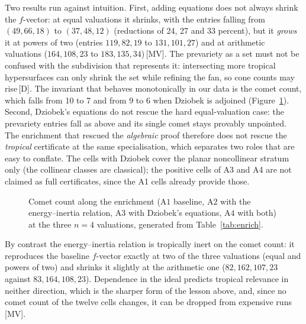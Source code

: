 \documentclass[11pt]{article}
\theoremstyle{definition}
\theoremstyle{remark}
\newcommand{\mk}[1]{\,{\scriptsize[#1]}}
\newcommand{\MV}{\mk{MV}}
\newcommand{\Dm}{\mk{D}}
\begin{document}
Two results run against intuition. First, adding equations does not always shrink the
$f$-vector: at equal valuations it shrinks, with the entries falling from $(49,66,18)$ to
$(37,48,12)$ (reductions of 24, 27 and 33 percent), but it \emph{grows} it at powers of two
(entries $119,82,19$ to $131,101,27$) and at arithmetic valuations ($164,108,23$ to $183,135,34$)\MV.
The prevariety as a set
must not be confused with the subdivision that represents it:
intersecting more tropical hypersurfaces can only shrink the set while refining the
fan, so cone counts may rise\Dm. The invariant that behaves monotonically in our data
is the comet count, which falls from 10 to 7 and from 9 to 6 when Dziobek is
adjoined (Figure~\ref{fig:enrich}). Second, Dziobek's equations do not rescue the hard equal-valuation case: the
prevariety entries fall as above and its
single comet stays provably unpointed. The enrichment that rescued the
\emph{algebraic} proof therefore does not rescue the \emph{tropical} certificate at
the same specialisation, which separates two roles that are easy to conflate. The cells with Dziobek
cover the planar noncollinear stratum only (the collinear classes are classical); the positive cells of
A3 and A4 are not claimed as full certificates, since the A1 cells already provide those.

\begin{figure}[t]\centering
{}
\caption{Comet count along the enrichment ($\mathrm{A1}$ baseline, $\mathrm{A2}$ with the
energy--inertia relation, $\mathrm{A3}$ with Dziobek's equations, $\mathrm{A4}$ with both) at the
three $n=4$ valuations, generated from Table~\ref{tab:enrich}.}\label{fig:enrich}
\end{figure}

By contrast the energy--inertia relation is tropically inert on the comet count: it reproduces the
baseline $f$-vector exactly at two of the three valuations (equal and powers of two) and shrinks it slightly
at the arithmetic one ($82,162,107,23$ against $83,164,108,23$). Dependence in the ideal
predicts tropical relevance in neither direction, which is the sharper form of the
lesson above, and, since no comet count of the twelve cells changes, it can be dropped from expensive runs\MV.
\end{document}
